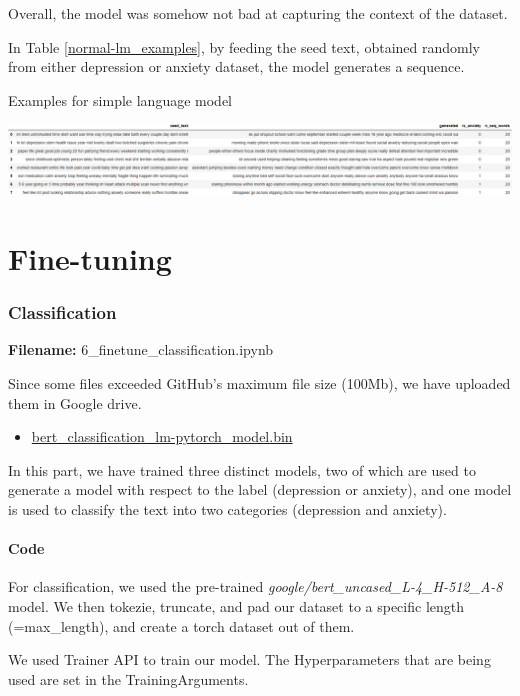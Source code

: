 \documentclass[12pt, a4paper]{article}
\begin{document}
	Overall, the model was somehow not bad at capturing the context of the dataset. 
	
	In Table \ref{normal-lm_examples}, by feeding the seed text, obtained randomly from either depression or anxiety dataset, the model generates a sequence.
	\begin{table}[H]
		\caption{Examples for simple language model} 
		\centering 
		\vspace{5mm} 
		\includegraphics[width=1.2\linewidth, 
		keepaspectratio]{../reports/images/normal-lm_examples.png}
		\label{normal-lm_examples} 
	\end{table}
	
	\newpage
	\part{Fine-tuning}
	\section{Classification}
	\large{\textbf{Filename:} 6\_finetune\_classification.ipynb}
	
	Since some files exceeded GitHub's maximum file size (100Mb), we have uploaded them in Google drive.
	\begin{itemize}
		\item \href{https://drive.google.com/file/d/1Lbbhh2N92k3IjuZ5TObauPd2en5qAT6i/view?usp=sharing}{bert\_classification\_lm-pytorch\_model.bin}
	\end{itemize}
	
	In this part, we have trained three distinct models, two of which are used to generate a model with respect to the label (depression or anxiety), and one model is used to classify the text into two categories (depression and anxiety).
	
	\subsection{Code}
	For classification, we used the pre-trained \emph{google/bert\_uncased\_L-4\_H-512\_A-8} model. We then tokezie, truncate, and pad our dataset to a specific length (=max\_length), and create a torch dataset out of them.
	
	We used Trainer API to train our model. The Hyperparameters that are being used are set in the TrainingArguments.
	
\end{document}
